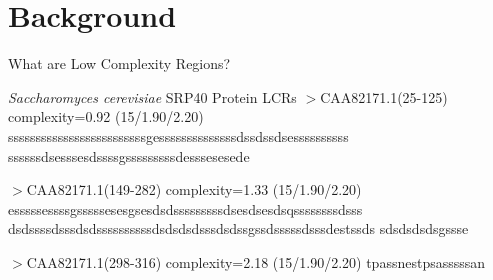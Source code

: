 \documentclass{beamer}
\begin{document}
	\section{Background}
	\begin{frame}{What are Low Complexity Regions?}
		\label{link1}
		
		\begin{block}{\textit{Saccharomyces cerevisiae} SRP40 Protein LCRs}
			$>$CAA82171.1(25-125) complexity=0.92 (15/1.90/2.20)
			sssssssssssssssssssssssssgessssssssssssssdssdssdsessssssssss
			ssssssdsesssesdssssgsssssssssdesssesesede \newline
			
			$>$CAA82171.1(149-282) complexity=1.33 (15/1.90/2.20)
			esssssessssgsssssesesgsesdsdsssssssssdsesdsesdsqssssssssdsss
			dsdssssdsssdsdssssssssssdsdsdsdsssdsdssgssdsssssdsssdestssds
			sdsdsdsdsgssse \newline
			
			$>$CAA82171.1(298-316) complexity=2.18 (15/1.90/2.20)
			tpassnestpsasssssan
			
		\end{block}		
		
	\end{frame}

		
		
\end{document}
